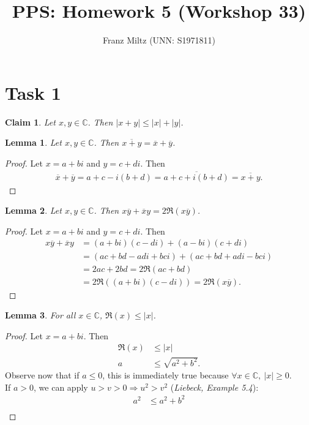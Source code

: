 \documentclass{article}
\title{PPS: Homework 5 (Workshop 33)}
\author{Franz Miltz (UNN: S1971811)}
\newcommand*\lneg[1]{\overline{#1}}
\newcommand{\C}{\mathbb{C}}
\newtheorem{claim}[section]{Claim}
\newtheorem{lemma}{Lemma}[section]
\begin{document}
\maketitle
\section*{Task 1}
\begin{claim}
  Let $x,y\in\C$. Then $|x+y|\leq |x|+|y|$.
\end{claim}
\begin{adjustwidth}{2em}{0pt}
  \begin{lemma}
    \label{l1}
    Let $x,y\in\C$. Then $\lneg{x+y}=\lneg{x}+\lneg{y}$. 
  \end{lemma}
  \begin{proof}
    Let $x=a+bi$ and $y=c+di$. Then
    \begin{align*}
      \lneg{x}+\lneg{y}=a+c-i(b+d)=\lneg{a+c+i(b+d)}=\lneg{x+y}.
    \end{align*}
  \end{proof}
  \begin{lemma}
    \label{l2}
    Let $x,y\in\C$. Then $x\lneg{y}+\lneg{x}y=2\Re({x\lneg{y}})$.
  \end{lemma}
  \begin{proof}
    Let $x=a+bi$ and $y=c+di$. Then
    \begin{align*}
      x\lneg{y}+\lneg{x}y&=(a+bi)(c-di)+(a-bi)(c+di)\\
      &=(ac+bd-adi+bci)+(ac+bd+adi-bci)\\
      &=2ac+2bd=2\Re(ac+bd)\\
      &=2\Re((a+bi)(c-di))=2\Re(x\lneg{y}).
    \end{align*}
  \end{proof}
  \begin{lemma}
    \label{l3}
    For all $x\in\C$, $\Re(x)\leq|x|$.
  \end{lemma}
  \begin{proof}
    Let $x=a+bi$. Then
    \begin{align*}
      \Re(x)&\leq|x|\\
      a&\leq \sqrt{a^2+b^2}.
    \end{align*}
    Observe now that if $a\leq0$, this is immediately true because $\forall x\in\C,\:|x|\geq 0$.\\
    If $a>0$, we can apply $u>v>0\Rightarrow u^2>v^2$ (\emph{Liebeck, Example 5.4}):
    \begin{align*}
      a^2&\leq a^2+b^2\\

\end{align*}
\end{proof}
\end{adjustwidth}
\end{document}
